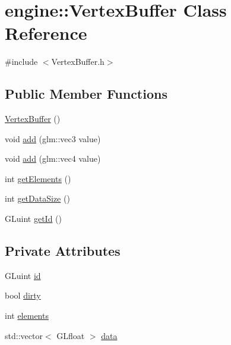 \hypertarget{classengine_1_1_vertex_buffer}{}\section{engine\+:\+:Vertex\+Buffer Class Reference}
\label{classengine_1_1_vertex_buffer}


{\ttfamily \#include $<$Vertex\+Buffer.\+h$>$}

\subsection*{Public Member Functions}
\begin{DoxyCompactItemize}
\item 
\mbox{\hyperlink{classengine_1_1_vertex_buffer_a1e1dd77064470b30755ea7d8703bec78}{Vertex\+Buffer}} ()
\item 
void \mbox{\hyperlink{classengine_1_1_vertex_buffer_a85bf8a44cccaa24b7587ed655b5c10c0}{add}} (glm\+::vec3 value)
\item 
void \mbox{\hyperlink{classengine_1_1_vertex_buffer_a5f18e939543af58e0cffabf14d677866}{add}} (glm\+::vec4 value)
\item 
int \mbox{\hyperlink{classengine_1_1_vertex_buffer_ab5e56f9c49bc89077d042903f38a9ff1}{get\+Elements}} ()
\item 
int \mbox{\hyperlink{classengine_1_1_vertex_buffer_ab2b3b44b8a4ac07992eaf40229c116f9}{get\+Data\+Size}} ()
\item 
G\+Luint \mbox{\hyperlink{classengine_1_1_vertex_buffer_a3d1bcf6ce3b619bba2ddd57c7e5e0763}{get\+Id}} ()
\end{DoxyCompactItemize}
\subsection*{Private Attributes}
\begin{DoxyCompactItemize}
\item 
G\+Luint \mbox{\hyperlink{classengine_1_1_vertex_buffer_af6059d7db62b6b54280d3887c255e7bd}{id}}
\item 
bool \mbox{\hyperlink{classengine_1_1_vertex_buffer_a527a084dea041368a9be37271e870cb7}{dirty}}
\item 
int \mbox{\hyperlink{classengine_1_1_vertex_buffer_ae00b190273c764a9fc736b8671737af0}{elements}}
\item 
std\+::vector$<$ G\+Lfloat $>$ \mbox{\hyperlink{classengine_1_1_vertex_buffer_ab2cc376fcc77ce57f8c96ddda6afd92a}{data}}
\end{DoxyCompactItemize}


